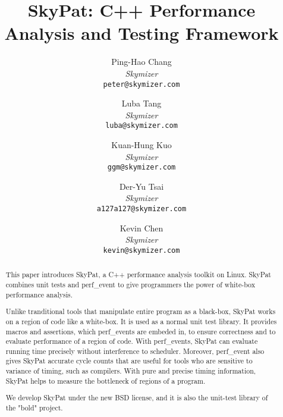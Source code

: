 \documentclass[final]{ols}
\begin{document}
\title{SkyPat: C++ Performance Analysis and Testing Framework}
\subtitle{}

\author{
	Ping-Hao Chang \\
	{\em Skymizer}\\
	{\tt\small peter@skymizer.com}\\
\and
	Luba Tang\\
	{\em Skymizer}\\
	{\tt\small luba@skymizer.com}\\
\and
	Kuan-Hung Kuo\\
	{\em Skymizer}\\
	{\tt\small ggm@skymizer.com}\\
\and
	Der-Yu Tsai\\
	{\em Skymizer}\\
	{\tt\small a127a127@skymizer.com}\\
\and
	Kevin Chen\\
	{\em Skymizer}\\
	{\tt\small kevin@skymizer.com}
}

\date{} %

\maketitle


\begin{abstract}
This paper introduces SkyPat, a C++ performance analysis toolkit on Linux. 
SkyPat combines unit tests and perf\_event to give programmers the power of white-box performance analysis.

Unlike tranditional tools that manipulate entire program as a black-box, SkyPat works on a region of code like a white-box.
It is used as a normal unit test library.
It provides macros and assertions, which perf\_events are embeded in, to ensure correctness and to evaluate performance of a region of code.
With perf\_events, SkyPat can evaluate running time precisely without interference to scheduler.
Moreover, perf\_event also gives SkyPat accurate cycle counts that are useful for tools who are sensitive to variance of timing, such as compilers.
With pure and precise timing information, SkyPat helps to measure the bottleneck of regions of a program.

We develop SkyPat under the new BSD license, and it is also the unit-test library of the "bold" project.
\end{abstract}
\end{document}
